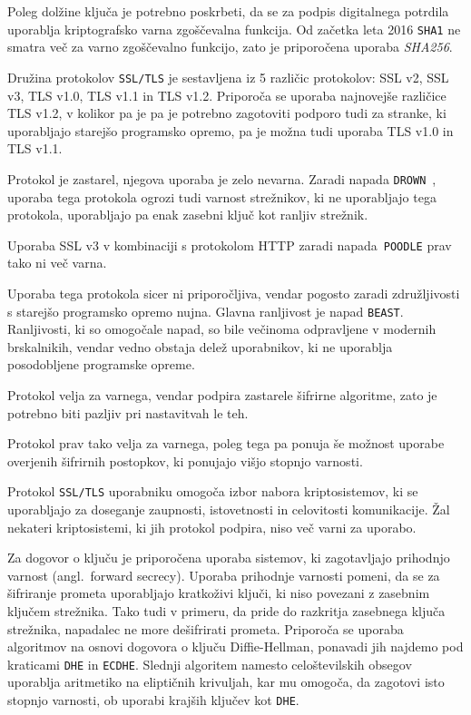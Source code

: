 \documentclass[12pt,a4paper,openany,tikz]{book}
\theoremstyle{plain}
\theoremstyle{definition}
\begin{document}
Poleg dolžine ključa je potrebno poskrbeti, da se za podpis digitalnega potrdila uporablja kriptografsko varna zgoščevalna funkcija. Od začetka leta 2016 \texttt{SHA1} ne smatra več za varno zgoščevalno funkcijo, zato je priporočena uporaba \textit{SHA256}.

Družina protokolov \texttt{SSL/TLS} je sestavljena iz 5 različic protokolov: SSL v2, SSL v3, TLS v1.0, TLS v1.1 in TLS v1.2. Priporoča se uporaba najnovejše različice TLS v1.2, v kolikor pa je pa je potrebno zagotoviti podporo tudi za stranke, ki uporabljajo starejšo programsko opremo, pa je možna tudi uporaba TLS v1.0 in TLS v1.1.

\begin{mdframed}[frametitle=Pregled različic protokola SSL/TLS]
  \begin{description}[style=nextline]
    \item[SSL v2] Protokol je zastarel, njegova uporaba je zelo nevarna. Zaradi napada \texttt{DROWN}~\cite{aviramdrown}, uporaba tega protokola ogrozi tudi varnost strežnikov, ki ne uporabljajo tega protokola, uporabljajo pa enak zasebni ključ kot ranljiv strežnik.
    \item[SSL v3] Uporaba SSL v3 v kombinaciji s protokolom HTTP zaradi napada\ \texttt{POODLE} \cite{moller2014poodle} prav tako ni več varna.
    \item[TLS v1.0] Uporaba tega protokola sicer ni priporočljiva, vendar pogosto zaradi združljivosti s starejšo programsko opremo nujna. Glavna ranljivost je napad \texttt{BEAST}. Ranljivosti, ki so omogočale napad, so bile večinoma odpravljene v modernih brskalnikih, vendar vedno obstaja delež uporabnikov, ki ne uporablja posodobljene programske opreme.
    \item[TLS v1.1] Protokol velja za varnega, vendar podpira zastarele šifrirne algoritme, zato je potrebno biti pazljiv pri nastavitvah le teh.
    \item[TLS v1.2] Protokol prav tako velja za varnega, poleg tega pa ponuja še možnost uporabe overjenih šifrirnih postopkov, ki ponujajo višjo stopnjo varnosti.
  \end{description}
\end{mdframed}


Protokol \texttt{SSL/TLS} uporabniku omogoča izbor nabora kriptosistemov, ki se uporabljajo za doseganje zaupnosti, istovetnosti in celovitosti komunikacije. Žal nekateri kriptosistemi, ki jih protokol podpira, niso več varni za uporabo.

Za dogovor o ključu je priporočena uporaba sistemov, ki zagotavljajo prihodnjo varnost (angl.\ forward secrecy). Uporaba prihodnje varnosti pomeni, da se za šifriranje prometa uporabljajo kratkoživi ključi, ki niso povezani z zasebnim ključem strežnika. Tako tudi v primeru, da pride do razkritja zasebnega ključa strežnika, napadalec ne more dešifrirati prometa. Priporoča se uporaba algoritmov na osnovi dogovora o ključu Diffie-Hellman, ponavadi jih najdemo pod kraticami \texttt{DHE} in \texttt{ECDHE}. Slednji algoritem namesto celoštevilskih obsegov uporablja aritmetiko na eliptičnih krivuljah, kar mu omogoča, da zagotovi isto stopnjo varnosti, ob uporabi krajših ključev kot \texttt{DHE}.
\end{document}
